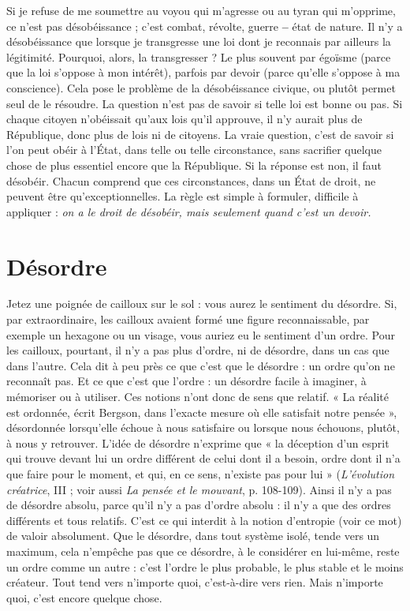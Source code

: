 Si je refuse de me soumettre au voyou qui m’agresse ou au tyran qui
m'opprime, ce n’est pas désobéissance ; c’est combat, révolte, guerre {\bf --} état de
nature. Il n’y a désobéissance que lorsque je transgresse une loi dont je reconnais
par ailleurs la légitimité. Pourquoi, alors, la transgresser ? Le plus souvent
par égoïsme (parce que la loi s’oppose à mon intérêt), parfois par devoir (parce
qu'elle s'oppose à ma conscience). Cela pose le problème de la désobéissance
civique, ou plutôt permet seul de le résoudre. La question n’est pas de savoir si
telle loi est bonne ou pas. Si chaque citoyen n’obéissait qu'aux lois qu'il
approuve, il n’y aurait plus de République, donc plus de lois ni de citoyens. La
vraie question, c’est de savoir si l’on peut obéir à l'État, dans telle ou telle circonstance,
sans sacrifier quelque chose de plus essentiel encore que la République.
Si la réponse est non, il faut désobéir. Chacun comprend que ces circonstances,
dans un État de droit, ne peuvent être qu’exceptionnelles. La règle
est simple à formuler, difficile à appliquer : {\it on a le droit de désobéir, mais
seulement quand c'est un devoir.}

\section{Désordre}
Jetez une poignée de cailloux sur le sol : vous aurez le sentiment
du désordre. Si, par extraordinaire, les cailloux avaient
formé une figure reconnaissable, par exemple un hexagone ou un visage, vous
auriez eu le sentiment d’un ordre. Pour les cailloux, pourtant, il n’y a pas plus
d'ordre, ni de désordre, dans un cas que dans l’autre. Cela dit à peu près ce que
c'est que le désordre : un ordre qu’on ne reconnaît pas. Et ce que c’est que
l’ordre : un désordre facile à imaginer, à mémoriser ou à utiliser. Ces notions
n'ont donc de sens que relatif. « La réalité est ordonnée, écrit Bergson, dans
l’exacte mesure où elle satisfait notre pensée », désordonnée lorsqu’elle échoue
à nous satisfaire ou lorsque nous échouons, plutôt, à nous y retrouver. L'idée
de désordre n’exprime que « la déception d’un esprit qui trouve devant lui un
ordre différent de celui dont il a besoin, ordre dont il n’a que faire pour le
moment, et qui, en ce sens, n'existe pas pour lui » ({\it L'évolution créatrice}, III ;
voir aussi {\it La pensée et le mouvant}, p. 108-109). Ainsi il n’y a pas de désordre
absolu, parce qu’il n’y a pas d’ordre absolu : il n’y a que des ordres différents et
tous relatifs. C’est ce qui interdit à la notion d’entropie (voir ce mot) de valoir
absolument. Que le désordre, dans tout système isolé, tende vers un maximum,
cela n'empêche pas que ce désordre, à le considérer en lui-même, reste un ordre
comme un autre : c’est l’ordre le plus probable, le plus stable et le moins créateur.
Tout tend vers n’importe quoi, c’est-à-dire vers rien. Mais n'importe
quoi, c’est encore quelque chose.

